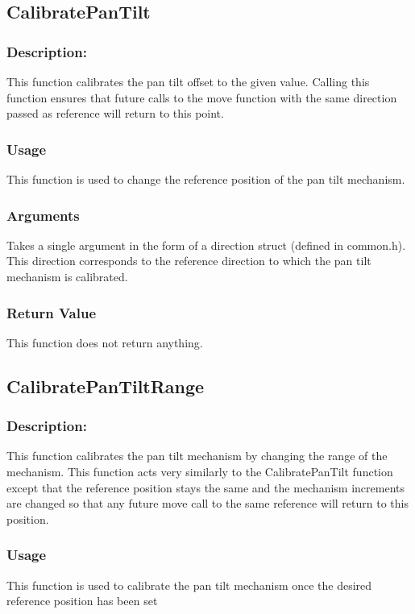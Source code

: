 \documentclass[]{report}
\begin{document}
\subsection{CalibratePanTilt}
\subsubsection{Description:}
This function calibrates the pan tilt offset to the given value. Calling this function ensures that future calls to the move function with the same direction passed as reference will return to this point. 

\subsubsection{Usage}
This function is used to change the reference position of the pan tilt mechanism.

\subsubsection{Arguments}
Takes a single argument in the form of a direction struct (defined in common.h). This direction corresponds to the reference direction to which the pan tilt mechanism is calibrated.

\subsubsection{Return Value}
This function does not return anything.

\subsection{CalibratePanTiltRange}
\subsubsection{Description:}
This function calibrates the pan tilt mechanism by changing the range of the mechanism. This function acts very similarly to the CalibratePanTilt function except that the reference position stays the same and the mechanism increments are changed so that any future move call to the same reference will return to this position.

\subsubsection{Usage}
This function is used to calibrate the pan tilt mechanism once the desired reference position has been set
\end{document}
